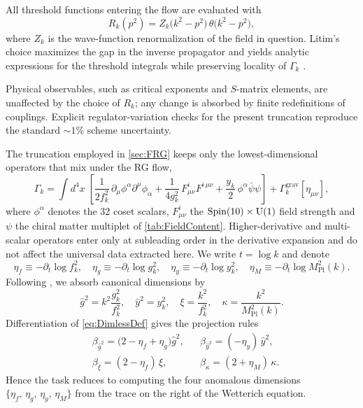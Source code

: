 \documentclass[pdflatex,sn-mathphys-num]{sn-jnl}
\theoremstyle{thmstyleone}
\theoremstyle{thmstylethree}%
\theoremstyle{thmstyletwo}%
\begin{document}
\begin{appendices}
All threshold functions entering the flow are evaluated with
\[
  R_{k}(p^{2})
  = Z_{k}\bigl(k^{2}-p^{2}\bigr)\,
    \theta\bigl(k^{2}-p^{2}\bigr),
\]
where $Z_{k}$ is the wave-function renormalization of the field in question.
Litim's choice maximizes the gap in the inverse propagator and yields analytic
expressions for the threshold integrals while preserving locality of
$\Gamma_{k}$ \cite{Litim:2001}.

Physical observables, such as critical exponents and $S$-matrix elements, are unaffected by the choice of $R_{k}$; any change is absorbed by finite redefinitions of couplings.  Explicit regulator-variation checks for the present truncation reproduce the standard $\sim1\%$ scheme uncertainty.

The truncation employed in \autoref{sec:FRG} keeps only the lowest-dimensional
operators that mix under the RG flow,
\begin{equation*}\label{eq:TruncAnsatz}
  \Gamma_{k}
  = \int d^{4}x\;
    \left[
        \frac{1}{2f^{2}_{k}}\,\partial_{\mu}\phi^{\alpha}\partial^{\mu}\phi_{\alpha}
      + \frac{1}{4g^{2}_{k}}\,F^{i}_{\mu\nu}F^{i\,\mu\nu}
      + \frac{y_{k}}{2}\,\phi^{\alpha}\bar\psi\psi
    \right]
  + \Gamma_{k}^{\text{grav}}[\eta_{\mu\nu}],
\end{equation*}
where \(\phi^{\alpha}\) denotes the $32$ coset scalars,
\(F^{i}_{\mu\nu}\) the \(\operatorname{Spin}(10) \times \mathrm{U(1)}\) field strength and
\(\psi\) the chiral matter multiplet of \autoref{tab:FieldContent}.
Higher-derivative and multi-scalar operators enter only at subleading
order in the derivative expansion and do not affect the universal data
extracted here.
We write \(t=\log k\) and denote
\[
  \eta_{f}\equiv-\partial_{t}\log f^{2}_{k},
  \quad
  \eta_{g}\equiv-\partial_{t}\log g^{2}_{k},
  \quad
  \eta_{y}\equiv-\partial_{t}\log y^{2}_{k},
  \quad
  \eta_{M}\equiv-\partial_{t}\log M_{\mathrm{Pl}}^{2}(k).
\]
Following \cite{Percacci2017}, we absorb canonical dimensions by
\begin{equation}\label{eq:DimlessDef}
  \hat g^{2}=k^{2}\frac{g^{2}_{k}}{f^{2}_{k}},\quad
  \hat y^{2}=y^{2}_{k},\quad
  \xi=\frac{k^{2}}{f^{2}_{k}},\quad
  \kappa=\frac{k^{2}}{M_{\mathrm{Pl}}^{2}(k)}.
\end{equation}
Differentiation of \eqref{eq:DimlessDef} gives the projection rules
\begin{equation}\label{eq:ProjGauge}
  \begin{aligned}
  &\beta_{\hat g^{2}}
    =\bigl(2-\eta_{f}+\eta_{g}\bigr)\hat g^{2},&
  &\beta_{\hat y^{2}}
   = ( -\eta_{y})\,\hat y^{2},\\
  &\beta_{\xi}= (2-\eta_{f})\,\xi,&
  &\beta_{\kappa}=(2+\eta_{M})\,\kappa.
  \end{aligned}
\end{equation}
Hence the task reduces to computing the four anomalous
dimensions \(\{\eta_{f},\,\eta_{g},\,\eta_{y},\,\eta_{M}\}\) from the trace on
the right of the Wetterich equation.


\end{appendices}
\end{document}
